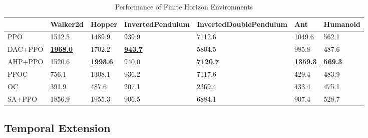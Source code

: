 \begin{table}[]
\caption{Performance of Finite Horizon Environments}
\label{table:single_finite}
\vskip 0.15in
\begin{center}
\begin{tabular}{|l|l|l|l|l|l|l|}
\hline
        & Walker2d           & Hopper             & InvertedPendulum  & InvertedDoublePendulum & Ant                & Humanoid          \\ \hline
PPO     & 1512.5                & 1489.9                & 939.9                & 7112.6                    & 1049.6                & 562.1                \\ \hline
DAC+PPO & {\ul \textbf{1968.0}} & 1702.2                & {\ul \textbf{943.7}} & 5804.5                    & 985.8                 & 487.6                \\ \hline
AHP+PPO & 1520.6                & {\ul \textbf{1993.6}} & 940.0                & {\ul \textbf{7120.7}}     & {\ul \textbf{1359.3}} & {\ul \textbf{569.3}} \\ \hline
PPOC    & 756.1                 & 1308.1                & 936.2                & 7117.6                    & 429.4                 & 483.9                \\ \hline
OC      & 391.9                 & 487.6                 & 207.1                & 2369.4                    & 433.4                 & 475.1                \\ \hline
SA+PPO  & 1856.9                & 1955.3                & 906.5                & 6884.1                    & 907.4                 & 528.7                \\ \hline
\end{tabular}
\end{center}
\vskip -0.1in
\end{table}

\newpage
\subsection{Temporal Extension}
\label{sec:append_exp_ext}

